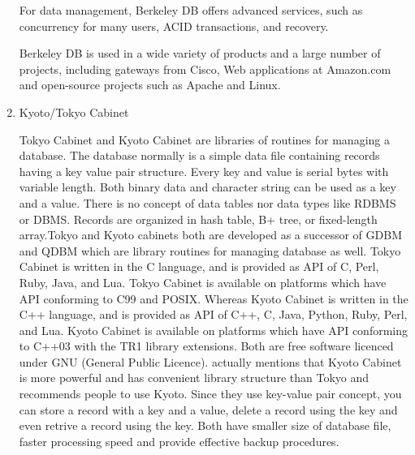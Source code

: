 \begin{enumerate}
\label{\detokenize{i524/technologies:id409}}{\hyperref[\detokenize{i524/technologies:www-bdb}]{\sphinxcrossref{{[}349{]}}}} For data management, Berkeley DB offers advanced
services, such as concurrency for many users, ACID transactions,
and recovery.

Berkeley DB is used in a wide variety of products and a large
number of projects, including gateways from Cisco, Web
applications at Amazon.com and open-source projects such as
Apache and Linux.

\item {} 
Kyoto/Tokyo Cabinet

Tokyo Cabinet \label{\detokenize{i524/technologies:id410}}{\hyperref[\detokenize{i524/technologies:www-tokyo-cabinet}]{\sphinxcrossref{{[}350{]}}}} and Kyoto Cabinet
\label{\detokenize{i524/technologies:id411}}{\hyperref[\detokenize{i524/technologies:www-kyoto-cabinet}]{\sphinxcrossref{{[}351{]}}}} are libraries of routines for managing
a database. The database normally is a simple data file
containing records having a key value pair structure. Every key
and value is serial bytes with variable length. Both binary data
and character string can be used as a key and a value. There is
no concept of data tables nor data types like RDBMS or
DBMS. Records are organized in hash table, B+ tree, or
fixed-length array.Tokyo and Kyoto cabinets both are developed as
a successor of GDBM and QDBM which are library routines for
managing database as well. Tokyo Cabinet is written in the C
language, and is provided as API of C, Perl, Ruby, Java, and
Lua. Tokyo Cabinet is available on platforms which have API
conforming to C99 and POSIX. Whereas Kyoto Cabinet is written in
the C++ language, and is provided as API of C++, C, Java, Python,
Ruby, Perl, and Lua. Kyoto Cabinet is available on platforms
which have API conforming to C++03 with the TR1 library
extensions. Both are free software licenced under GNU (General
Public Licence). \label{\detokenize{i524/technologies:id412}}{\hyperref[\detokenize{i524/technologies:www-tokyo-cabinet}]{\sphinxcrossref{{[}350{]}}}} actually mentions that
Kyoto Cabinet is more powerful and has convenient library
structure than Tokyo and recommends people to use Kyoto. Since
they use key-value pair concept, you can store a record with a
key and a value, delete a record using the key and even retrive a
record using the key. Both have smaller size of database file,
faster processing speed and provide effective backup procedures.


\end{enumerate}
